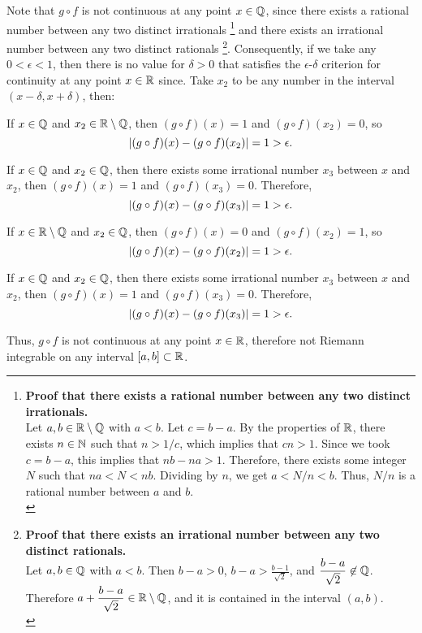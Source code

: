 \begin{answer}
  Note that $g \circ f$ is not continuous at any point $x \in \mathbb{Q}$,
  since there exists a rational number between any two distinct irrationals
  \footnote{
    \textbf{Proof that there exists a rational number between any two distinct irrationals.} \\
    Let $a, b \in \mathbb{R} \setminus \mathbb{Q}$ with $a < b$.
    Let $c = b - a$. By the properties of $\mathbb{R}$, there exists $n \in \mathbb{N}$
    such that $n > 1/c$, which implies that $cn > 1$.
    Since we took $c = b - a$, this implies that $nb - na > 1$.
    Therefore, there exists some integer $N$ such that $na < N < nb$.
    Dividing by $n$, we get $a < N/n < b$.
    Thus, $N/n$ is a rational number between $a$ and $b$. \\
  }
  and there exists an irrational number between any two distinct rationals
  \footnote {
    \textbf{Proof that there exists an irrational number between any two distinct rationals.} \\
    Let $a, b \in \mathbb{Q}$ with $a < b$.
    Then $b - a > 0$, $\displaystyle b - a > \frac{b-1}{\sqrt{2}}$,
    and $\displaystyle \frac{b - a}{\sqrt{2}} \not \in \mathbb{Q}$.
    Therefore $\displaystyle a + \frac{b - a}{\sqrt{2}} \in \mathbb{R} \setminus \mathbb{Q}$, and it is contained
    in the interval $(a, b)$. \\
  }.
  Consequently, if we take any $0 < \epsilon < 1$, then there is no value
  for $\delta > 0$ that satisfies the $\epsilon$-$\delta$ criterion for continuity
  at any point $x \in \mathbb{R}$ since. Take $x_2$ to be any number in the interval
  $(x - \delta, x + \delta)$, then:
  \begin{enumarabic}
    \item If $x \in \mathbb{Q}$ and $x_2 \in \mathbb{R} \setminus \mathbb{Q}$, then
      $(g \circ f)(x) = 1$ and $(g \circ f)(x_2) = 0$,
      so \[ \lvert(g \circ f)(x) - (g \circ f)(x_2)\rvert = 1 > \epsilon. \]
    \item If $x \in \mathbb{Q}$ and $x_2 \in \mathbb{Q}$, then there exists some irrational number
      $x_3$ between $x$ and $x_2$, then $(g \circ f)(x) = 1$
      and $(g \circ f)(x_3) = 0$. Therefore,
      \[ \lvert(g \circ f)(x) - (g \circ f)(x_3)\rvert = 1 > \epsilon. \]
    \item If $x \in \mathbb{R} \setminus \mathbb{Q}$ and $x_2 \in \mathbb{Q}$, then
      $(g \circ f)(x) = 0$ and $(g \circ f)(x_2) = 1$,
      so \[ \lvert(g \circ f)(x) - (g \circ f)(x_2)\rvert = 1 > \epsilon. \]
    \item If $x \in \mathbb{Q}$ and $x_2 \in \mathbb{Q}$, then there exists some irrational number
      $x_3$ between $x$ and $x_2$, then $(g \circ f)(x) = 1$
      and $(g \circ f)(x_3) = 0$. Therefore,
      \[ \lvert(g \circ f)(x) - (g \circ f)(x_3)\rvert = 1 > \epsilon. \]
  \end{enumarabic}

  \step
  Thus,  $g \circ f$ is not continuous at any point $x \in \mathbb{R}$,
  therefore not Riemann integrable on any interval $[a, b] \subset \mathbb{R}$.
\end{answer}
